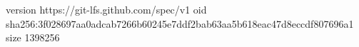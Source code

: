 version https://git-lfs.github.com/spec/v1
oid sha256:3f028697aa0adcab7266b60245e7ddf2bab63aa5b618eac47d8eccdf807696a1
size 1398256
